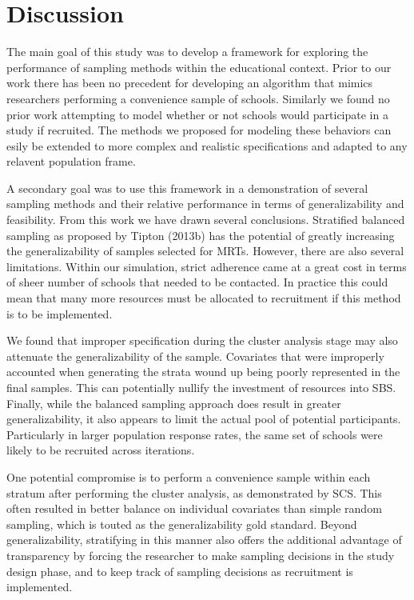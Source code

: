 \documentclass[man,floatsintext]{apa6}
\begin{document}
\hypertarget{discussion}{%
\section{Discussion}\label{discussion}}

The main goal of this study was to develop a framework for exploring the performance of sampling methods within the educational context. Prior to our work there has been no precedent for developing an algorithm that mimics researchers performing a convenience sample of schools. Similarly we found no prior work attempting to model whether or not schools would participate in a study if recruited. The methods we proposed for modeling these behaviors can esily be extended to more complex and realistic specifications and adapted to any relavent population frame.

A secondary goal was to use this framework in a demonstration of several sampling methods and their relative performance in terms of generalizability and feasibility. From this work we have drawn several conclusions. Stratified balanced sampling as proposed by Tipton (2013b) has the potential of greatly increasing the generalizability of samples selected for MRTs. However, there are also several limitations. Within our simulation, strict adherence came at a great cost in terms of sheer number of schools that needed to be contacted. In practice this could mean that many more resources must be allocated to recruitment if this method is to be implemented.

We found that improper specification during the cluster analysis stage may also attenuate the generalizability of the sample. Covariates that were improperly accounted when generating the strata wound up being poorly represented in the final samples. This can potentially nullify the investment of resources into SBS. Finally, while the balanced sampling approach does result in greater generalizability, it also appears to limit the actual pool of potential participants. Particularly in larger population response rates, the same set of schools were likely to be recruited across iterations.

One potential compromise is to perform a convenience sample within each stratum after performing the cluster analysis, as demonstrated by SCS. This often resulted in better balance on individual covariates than simple random sampling, which is touted as the generalizability gold standard. Beyond generalizability, stratifying in this manner also offers the additional advantage of transparency by forcing the researcher to make sampling decisions in the study design phase, and to keep track of sampling decisions as recruitment is implemented.
\end{document}
